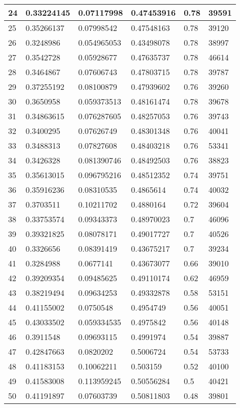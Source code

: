 \begin{longtable}{|l|l|l|l|l|l|}
24 & 0.33224145 & 0.07117998 & 0.47453916 & 0.78 & 39591 \\ \hline 
25 & 0.35266137 & 0.07998542 & 0.47548163 & 0.78 & 39120 \\ \hline 
26 & 0.3248986 & 0.054965053 & 0.43498078 & 0.78 & 38997 \\ \hline 
27 & 0.3542728 & 0.05928677 & 0.47635737 & 0.78 & 46614 \\ \hline 
28 & 0.3464867 & 0.07606743 & 0.47803715 & 0.78 & 39787 \\ \hline 
29 & 0.37255192 & 0.08100879 & 0.47939602 & 0.76 & 39260 \\ \hline 
30 & 0.3650958 & 0.059373513 & 0.48161474 & 0.78 & 39678 \\ \hline 
31 & 0.34863615 & 0.076287605 & 0.48257053 & 0.76 & 39743 \\ \hline 
32 & 0.3400295 & 0.07626749 & 0.48301348 & 0.76 & 40041 \\ \hline 
33 & 0.3488313 & 0.07827608 & 0.48403218 & 0.76 & 53341 \\ \hline 
34 & 0.3426328 & 0.081390746 & 0.48492503 & 0.76 & 38823 \\ \hline 
35 & 0.35613015 & 0.096795216 & 0.48512352 & 0.74 & 39751 \\ \hline 
36 & 0.35916236 & 0.08310535 & 0.4865614 & 0.74 & 40032 \\ \hline 
37 & 0.3703511 & 0.10211702 & 0.4880164 & 0.72 & 39604 \\ \hline 
38 & 0.33753574 & 0.09343373 & 0.48970023 & 0.7 & 46096 \\ \hline 
39 & 0.39321825 & 0.08078171 & 0.49017727 & 0.7 & 40526 \\ \hline 
40 & 0.3326656 & 0.08391419 & 0.43675217 & 0.7 & 39234 \\ \hline 
41 & 0.3284988 & 0.0677141 & 0.43673077 & 0.66 & 39010 \\ \hline 
42 & 0.39209354 & 0.09485625 & 0.49110174 & 0.62 & 46959 \\ \hline 
43 & 0.38219494 & 0.09634253 & 0.49332878 & 0.58 & 53151 \\ \hline 
44 & 0.41155002 & 0.0750548 & 0.4954749 & 0.56 & 40051 \\ \hline 
45 & 0.43033502 & 0.059334535 & 0.4975842 & 0.56 & 40148 \\ \hline 
46 & 0.3911548 & 0.09693115 & 0.4991974 & 0.54 & 39887 \\ \hline 
47 & 0.42847663 & 0.0820202 & 0.5006724 & 0.54 & 53733 \\ \hline 
48 & 0.41183153 & 0.10062211 & 0.503159 & 0.52 & 40100 \\ \hline 
49 & 0.41583008 & 0.113959245 & 0.50556284 & 0.5 & 40421 \\ \hline 
50 & 0.41191897 & 0.07603739 & 0.50811803 & 0.48 & 39801 \\ \hline 
\end{longtable}